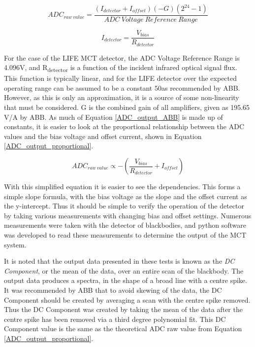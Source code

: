 \begin{equation} \label{ADC_output_ABB}
    ADC_{raw\:value} = \frac{(I_{detector} + I_{offset})(-G)(2^{24}-1)}{ADC\:Voltage\:Reference\:Range}
\end{equation}

\begin{equation} \label{ADC_I_detector}
    I_{detector} = \frac{V_{bias}}{R_{detector}}
\end{equation}

For the case of the LIFE MCT detector, the ADC Voltage Reference Range is 4.096V, and R\textsubscript{detector} is a function of the incident infrared optical signal flux. This function is typically linear, and for the LIFE detector over the expected operating range can be assumed to be a constant 50\textOmega as recommended by ABB. However, as this is only an approximation, it is a source of some non-linearity that must be considered. G is the combined gain of all amplifiers, given as 195.65 V/A by ABB. As much of Equation \ref{ADC_output_ABB} is made up of constants, it is easier to look at the proportional relationship between the ADC values and the bias voltage and offset current, shown in Equation \ref{ADC_output_proportional}.

\begin{equation} \label{ADC_output_proportional}
    ADC_{raw\:value} \propto -\left(\frac{V_{bias}}{R_{detector}} + I_{offset}\right)
\end{equation}

With this simplified equation it is easier to see the dependencies. This forms a simple slope formula, with the bias voltage as the slope and the offset current as the y-intercept. Thus it should be simple to verify the operation of the detector by taking various measurements with changing bias and offset settings. Numerous measurements were taken with the detector of blackbodies, and python software was developed to read these measurements to determine the output of the MCT system.

It is noted that the output data presented in these tests is known as the \textit{DC Component}, or the mean of the data, over an entire scan of the blackbody. The output data produces a spectra, in the shape of a broad line with a centre spike. It was recommended by ABB that to avoid skewing of the data, the DC Component should be created by averaging a scan with the centre spike removed. Thus the DC Component was created by taking the mean of the data after the centre spike has been removed via a third degree polynomial fit. This DC Component value is the same as the theoretical ADC raw value from Equation \ref{ADC_output_proportional}.

